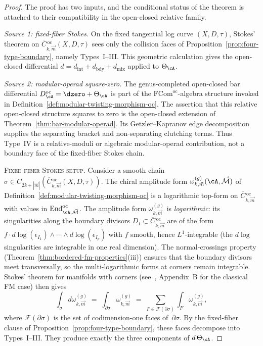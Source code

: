 \begin{proof}
The proof has two inputs, and the conditional status of the theorem is
attached to their compatibility in the open-closed relative family.

\emph{Source 1: fixed-fiber Stokes.}
On the fixed tangential log curve $(X,D,\tau)$, Stokes' theorem on
$\overline{C}{}^{\,\mathrm{oc}}_{k,\vec{m}}(X,D,\tau)$ sees only the
collision faces of
Proposition~\ref{prop:four-type-boundary}, namely Types~I--III. This
geometric calculation gives the open-closed differential
$d=d_{\mathrm{int}}+d_{\mathrm{bdy}}+d_{\mathrm{mix}}$ applied to
$\Theta_\cA$.

\emph{Source 2: modular-operad square-zero.}
The genus-completed open-closed bar differential
$D_\cA^{\mathrm{oc}}=\dzero+\Theta_\cA$ is part of the
$\mathrm{FCom}^{\mathrm{oc}}$-algebra structure invoked in
Definition~\ref{def:modular-twisting-morphism-oc}. The assertion that
this relative open-closed structure squares to zero is the
open-closed extension of Theorem~\ref{thm:bar-modular-operad}. Its
Getzler--Kapranov edge decomposition supplies the separating bracket
and non-separating clutching terms. Thus Type~IV is a relative-moduli
or algebraic modular-operad contribution, not a boundary face of the
fixed-fiber Stokes chain.

\medskip
\noindent\textsc{Fixed-fiber Stokes setup.}
Consider a smooth chain
$\sigma \in C_{2k + |\vec{m}|}
(\overline{C}{}^{\,\mathrm{oc}}_{k,\vec{m}}(X,D,\tau))$. The
chiral amplitude form
$\omega^{(g)}_{k,\vec{m}}(\cA, \vec{\mathcal{M}})$ of
Definition~\ref{def:modular-twisting-morphism-oc} is a
logarithmic top-form on
$\overline{C}{}^{\,\mathrm{oc}}_{k,\vec{m}}$ with values in
$\operatorname{End}^{\mathrm{oc}}_{\cA, \vec{\mathcal{M}}}$.
The amplitude form $\omega^{(g)}_{k,\vec{m}}$ is
\emph{logarithmic}: its singularities along the boundary
divisors $D_I \subset
\overline{C}{}^{\,\mathrm{oc}}_{k,\vec{m}}$ are of the form
$f \cdot d\log(\epsilon_{I_1}) \wedge \cdots \wedge
d\log(\epsilon_{I_p})$ with $f$ smooth, hence $L^1$-integrable
(the $d\log$ singularities are integrable in one real dimension).
The normal-crossings property
(Theorem~\ref{thm:bordered-fm-properties}(iii)) ensures that
the boundary divisors meet transversally, so the multi-logarithmic
forms at corners remain integrable. Stokes' theorem for
manifolds with corners (see~\cite{FM94}, Appendix~B for
the classical FM case) then gives
\begin{equation}\label{eq:stokes-bordered}
\int_\sigma d\omega^{(g)}_{k,\vec{m}}
\;=\;
\int_{\partial\sigma} \omega^{(g)}_{k,\vec{m}}
\;=\;
\sum_{F \in \mathcal{F}(\partial\sigma)}
\int_F \omega^{(g)}_{k,\vec{m}},
\end{equation}
where $\mathcal{F}(\partial\sigma)$ is the set of
codimension-one faces of~$\partial\sigma$. By the fixed-fiber clause
of Proposition~\ref{prop:four-type-boundary}, these faces decompose
into Types~I--III. They produce exactly the three components of
$d\,\Theta_\cA$.


\end{proof}
